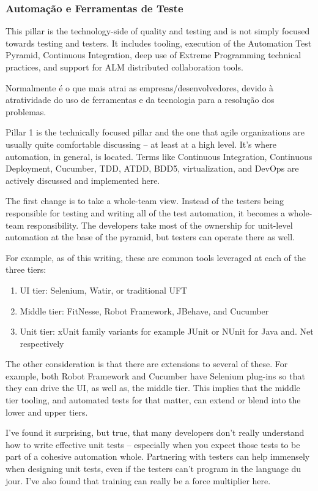 \documentclass[
	12pt,				%
	openright,			%
	oneside,			%
	a4paper,			%
	english,			%
	brazil,				%
	]{abntex2}
\begin{document}
\subsubsection{Automação e Ferramentas de Teste}
This pillar is the technology-side of quality and testing and is not simply focused towards testing and testers. It includes tooling, execution of the Automation Test Pyramid, Continuous Integration, deep use of Extreme Programming technical practices, and support for ALM distributed collaboration tools.

Normalmente é o que mais atrai as empresas/desenvolvedores, devido à atratividade do uso de ferramentas e da tecnologia para a resolução dos problemas.

Pillar 1 is the technically focused pillar and the one that agile organizations are usually quite comfortable discussing – at least at a high level. It's where automation, in general, is located. Terms like Continuous Integration, Continuous Deployment, Cucumber, TDD, ATDD, BDD5, virtualization, and DevOps are actively discussed and implemented here.

The first change is to take a whole-team view. Instead of the testers being responsible for testing and writing all of the test automation, it becomes a whole-team responsibility. The developers take most of the ownership for unit-level automation at the base of the pyramid, but testers can operate there as well.

For example, as of this writing, these are common tools leveraged at each of the three tiers:
\begin{enumerate}
    \item UI tier: Selenium, Watir, or traditional UFT
    \item Middle tier: FitNesse, Robot Framework, JBehave, and Cucumber
    \item Unit tier: xUnit family variants for example JUnit or NUnit for Java and. Net respectively
\end{enumerate}

The other consideration is that there are extensions to several of these. For example, both Robot Framework and Cucumber have Selenium plug-ins so that they can drive the UI, as well as, the middle tier. This implies that the middle tier tooling, and automated tests for that matter, can extend or blend into the lower and upper tiers.

I've found it surprising, but true, that many developers don't really understand how to write effective unit tests – especially when you expect those tests to be part of a cohesive automation whole. Partnering with testers can help immensely when designing unit tests, even if the testers can't program in the language du jour. I've also found that training can really be a force multiplier here.
\end{document}
